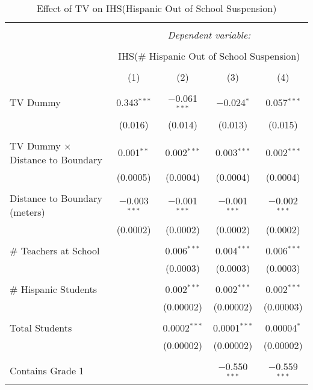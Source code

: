 
\begin{table}[!htbp] \centering 
  \caption{Effect of TV on IHS(Hispanic Out of School Suspension)} 
  \label{} 
\begin{tabular}{@{\extracolsep{-2pt}}lcccc} 
\\[-1.8ex]\hline 
\hline \\[-1.8ex] 
 & \multicolumn{4}{c}{\textit{Dependent variable:}} \\ 
\cline{2-5} 
\\[-1.8ex] & \multicolumn{4}{c}{IHS(\# Hispanic Out of School Suspension)} \\ 
\\[-1.8ex] & (1) & (2) & (3) & (4)\\ 
\hline \\[-1.8ex] 
 TV Dummy & 0.343$^{***}$ & $-$0.061$^{***}$ & $-$0.024$^{*}$ & 0.057$^{***}$ \\ 
  & (0.016) & (0.014) & (0.013) & (0.015) \\ 
  & & & & \\ 
 TV Dummy $\times$ Distance to Boundary & 0.001$^{**}$ & 0.002$^{***}$ & 0.003$^{***}$ & 0.002$^{***}$ \\ 
  & (0.0005) & (0.0004) & (0.0004) & (0.0004) \\ 
  & & & & \\ 
 Distance to Boundary (meters) & $-$0.003$^{***}$ & $-$0.001$^{***}$ & $-$0.001$^{***}$ & $-$0.002$^{***}$ \\ 
  & (0.0002) & (0.0002) & (0.0002) & (0.0002) \\ 
  & & & & \\ 
 \# Teachers at School &  & 0.006$^{***}$ & 0.004$^{***}$ & 0.006$^{***}$ \\ 
  &  & (0.0003) & (0.0003) & (0.0003) \\ 
  & & & & \\ 
 \# Hispanic Students &  & 0.002$^{***}$ & 0.002$^{***}$ & 0.002$^{***}$ \\ 
  &  & (0.00002) & (0.00002) & (0.00003) \\ 
  & & & & \\ 
 Total Students &  & 0.0002$^{***}$ & 0.0001$^{***}$ & 0.00004$^{*}$ \\ 
  &  & (0.00002) & (0.00002) & (0.00002) \\ 
  & & & & \\ 
 Contains Grade 1 &  &  & $-$0.550$^{***}$ & $-$0.559$^{***}$ \\ 

\end{tabular}
\end{table}
